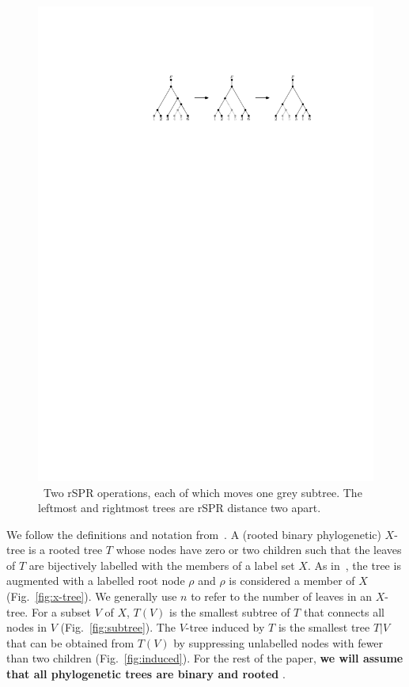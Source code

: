 \documentclass[10pt,twoside,leqno,twocolumn]{article}
\let\MYoriglatexcaption\caption
\renewcommand{\caption}[2][\relax]{\MYoriglatexcaption[#2]{#2}}
\newcommand{\cuttable}[2][]{%
    \ifthenelse{\equal{#1}{}}%
		{}%
		{#1}%
}
\begin{document}
\begin{figure}
	\includegraphics[scale=1.25]{figs/two-spr}
	\caption{\
    Two rSPR operations, each of which moves one grey subtree.
    The leftmost and rightmost trees are rSPR distance two apart.}
	\label{fig:two-spr}
\end{figure}


We follow the definitions and notation from~\cite{bordewich05,whidden2013hybridization, Whidden2015-yi}.
A (rooted binary phylogenetic) $X$-tree is a rooted tree $T$ whose nodes have zero or two children such that the leaves of $T$ are bijectively labelled with the members of a label set $X$.
As in~\cite{bordewich05,whidden2013hybridization,Whidden2015-yi}, the tree is augmented with a labelled root node $\rho$ and $\rho$ is considered a member of $X$ (Fig.~\ref{fig:x-tree}).
We generally use $n$ to refer to the number of leaves in an $X$-tree.
For a subset $V$ of $X$, $T(V)$ is the smallest subtree of $T$ that connects all nodes in $V$ (Fig.~\ref{fig:subtree}).
The $V$-tree induced by $T$ is the smallest tree $T|V$ that can be obtained from $T(V)$ by suppressing unlabelled nodes with fewer than two children (Fig.~\ref{fig:induced}).
For the rest of the paper, \textbf{we will assume that all phylogenetic trees are binary and rooted}\cuttable{, and thus that tree inclusion is rooted tree inclusion}.
\end{document}
